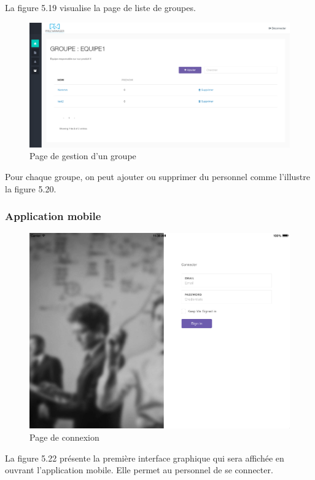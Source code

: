 \documentclass[12pt, ChapStyle1, oneside]{./Styles/Dea_Gsm}
\begin{document}
La figure 5.19 visualise la page de liste de groupes.

\begin{figure}[H]
    \centering
    \includegraphics[width=6in]{screenshots/web/pagegroupe}
    \caption{Page de gestion d'un groupe}

\end{figure}
Pour chaque groupe, on peut ajouter ou supprimer du personnel comme l'illustre la figure 5.20.

\subsubsection{Application mobile}

\begin{figure}[H]
    \centering
    \includegraphics[width=6in]{screenshots/a1}
    \caption{Page de connexion}

\end{figure}

La figure 5.22 présente la première interface graphique qui sera affichée en ouvrant l'application mobile. Elle permet au personnel de se connecter.
\end{document}
